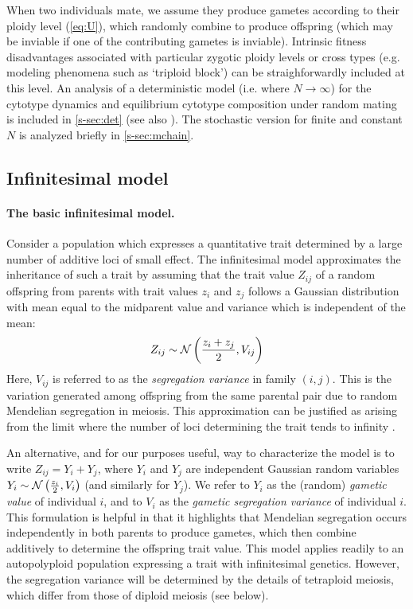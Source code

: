 \documentclass[12pt,a4paper]{article}
\begin{document}
    When two individuals mate, we assume they produce gametes according to their
    ploidy level (\cref{eq:U}), which randomly combine to produce offspring (which
    may be inviable if one of the contributing gametes is inviable).
    Intrinsic fitness disadvantages associated with particular zygotic ploidy
    levels or cross types (e.g. modeling phenomena such as `triploid block') can be
    straighforwardly included at this level.
    An analysis of a deterministic model (i.e. where $N \rightarrow \infty$) for
    the cytotype dynamics and equilibrium cytotype composition under random mating
    is included in \cref{s-sec:det} (see also \cite{felber1997,kauai2024}).
    The stochastic version for finite and constant $N$ is analyzed briefly in
    \cref{s-sec:mchain}.

    \subsection*{Infinitesimal model}

    \paragraph*{The basic infinitesimal model.}

    Consider a population which expresses a quantitative trait determined by a
    large number of additive loci of small effect.
    The infinitesimal model approximates the inheritance of such a trait by
    assuming that the trait value $Z_{ij}$ of a random offspring from parents with
    trait values $z_i$ and $z_j$ follows a Gaussian distribution with mean equal to
    the midparent value and variance which is independent of the mean:
      \begin{align}
      Z_{ij} \sim \mathcal{N}\left(\frac{z_i + z_j}{2}, V_{ij}\right)
      \label{eq:inf}
      \end{align}
    Here, $V_{ij}$ is referred to as the \textit{segregation variance} in family
    $(i,j)$.
    This is the variation generated among offspring from the same parental pair due
    to random Mendelian segregation in meiosis.
    This approximation can be justified as arising from the limit where the number
    of loci determining the trait tends to infinity \citep{barton2017}.

    An alternative, and for our purposes useful, way to characterize the model
    is to write $Z_{ij} = Y_i + Y_j$, where $Y_i$ and $Y_j$
    are independent Gaussian random variables $Y_i \sim \mathcal{N}\left(\frac{z_i}{2},
    V_i\right)$ (and similarly for $Y_j$).
    We refer to $Y_i$ as the (random) \textit{gametic value} of individual $i$, and
    to $V_i$ as the \textit{gametic segregation variance} of individual $i$.
    This formulation is helpful in that it highlights that Mendelian segregation
    occurs independently in both parents to produce gametes, which then combine
    additively to determine the offspring trait value.
    This model applies readily to an autopolyploid population expressing a trait
    with infinitesimal genetics.
    However, the segregation variance will be determined by the details of
    tetraploid meiosis, which differ from those of diploid meiosis (see below).
\end{document}
